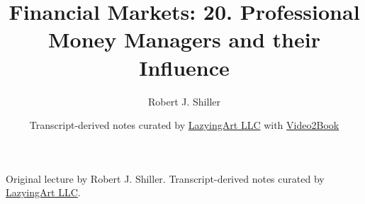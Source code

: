 \documentclass[11pt,oneside]{book}
\begin{document}
\frontmatter
\title{Financial Markets: 20. Professional Money Managers and their Influence}
\author{Robert J. Shiller}
\date{Transcript-derived notes curated by \href{https://lazying.art}{LazyingArt LLC} with \href{https://github.com/lachlanchen/Video2Book}{Video2Book}}
\maketitle
\begin{center}
\small Original lecture by Robert J. Shiller. Transcript-derived notes curated by \href{https://lazying.art}{LazyingArt LLC}.
\end{center}
\clearpage
\mainmatter

\end{document}
